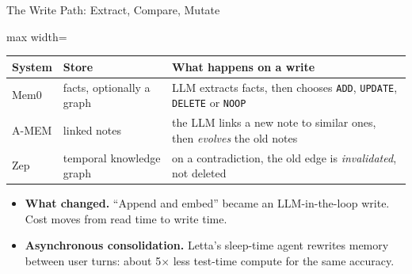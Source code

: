 \begin{frame}{The Write Path: Extract, Compare, Mutate}
    \begin{center}
    \small
    \renewcommand{\arraystretch}{1.25}
    \begin{adjustbox}{max width=\linewidth}\begin{tabular}{>{\raggedright\arraybackslash}p{1.9cm}>{\raggedright\arraybackslash}p{4.0cm}>{\raggedright\arraybackslash}p{7.2cm}}
        \toprule
        \textbf{System} & \textbf{Store} & \textbf{What happens on a write} \\
        \midrule
        Mem0 & facts, optionally a graph & LLM extracts facts, then chooses \texttt{ADD}, \texttt{UPDATE}, \texttt{DELETE} or \texttt{NOOP} \\
        A-MEM & linked notes & the LLM links a new note to similar ones, then \emph{evolves} the old notes \\
        Zep & temporal knowledge graph & on a contradiction, the old edge is \emph{invalidated}, not deleted \\
        \bottomrule
    \end{tabular}\end{adjustbox}
    \end{center}
    \begin{itemize}\itemsep0.45em
        \item \textbf{What changed.} ``Append and embed'' became an LLM-in-the-loop write. Cost moves from read time to write time.
        \item \textbf{Asynchronous consolidation.} Letta's sleep-time agent rewrites memory between user turns: about 5$\times$ less test-time compute for the same accuracy.
    \end{itemize}
\end{frame}

